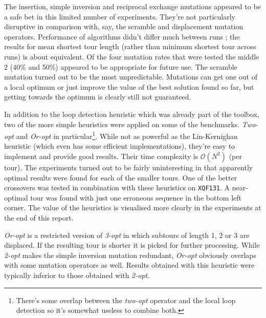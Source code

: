 \noindent The insertion, simple inversion and reciprocal exchange mutations appeared to be a safe bet in this limited number of experiments. They're not particularly disruptive in comparison with, say, the scramble and displacement mutation operators. Performance of algorithms didn't differ much between runs ; the results for mean shortest tour length (rather than minimum shortest tour across runs) is about equivalent. Of the four mutation rates that were tested the middle 2 (40\% and 50\%) appeared to be appropriate for future use. The scramble mutation turned out to be the most unpredictable. Mutations can get one out of a local optimum or just improve the value of the best solution found so far, but getting towards the optimum is clearly still not guaranteed.


In addition to the loop detection heuristic which was already part of the toolbox, two of the more simple heuristics were applied on some of the benchmarks. \textit{Two-opt} and \textit{Or-opt} in particular\footnote{There's some overlap between the \textit{two-opt} operator and the local loop detection so it's somewhat useless to combine both.}. While not as powerful as the Lin-Kernighan heuristic (which even has some efficient implementations), they're easy to implement and provide good results. Their time complexity is $\mathcal{O}(N^2)$ (per tour). The experiments turned out to be fairly uninteresting in that apparently optimal results were found for each of the smaller tours. One of the better crossovers was tested in combination with these heuristics on \texttt{XQF131}. A near-optimal tour was found with just one erroneous sequence in the bottom left corner. The value of the heuristics is visualised more clearly in the experiments at the end of this report.\\

\par\noindent \textit{Or-opt} is a restricted version of \textit{3-opt} in which subtours of length 1, 2 or 3 are displaced. If the resulting tour is shorter it is picked for further processing. While \textit{2-opt} makes the simple inversion mutation redundant, \textit{Or-opt} obviously overlaps with some mutation operators as well. Results obtained with this heuristic were typically inferior to those obtained with \textit{2-opt}.


